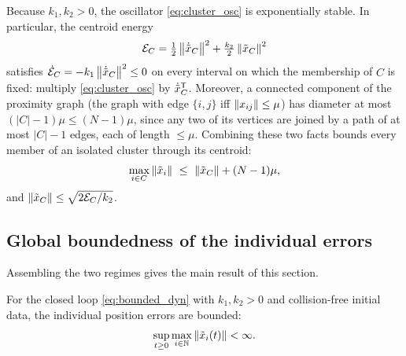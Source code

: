 Because $k_1,k_2>0$, the oscillator \eqref{eq:cluster_osc} is exponentially stable. In particular,
the centroid energy
\begin{equation}
  \mathcal E_C=\tfrac12\left\| \dot{\tilde{x}}_C \right\|^2+\tfrac{k_2}{2}\left\| \tilde{x}_C \right\|^2
  \label{eq:cluster_E}
\end{equation}
satisfies $\dot{\mathcal E}_C=-k_1\left\| \dot{\tilde{x}}_C \right\|^2\le0$ on every interval on which the
membership of $C$ is fixed: multiply \eqref{eq:cluster_osc} by $\dot{\tilde{x}}_C^{\mathsf T}$. Moreover, a
connected component of the proximity graph (the graph with edge $\{i,j\}$ iff $\left\| x_{ij} \right\|\le\mu$)
has diameter at most $(|C|-1)\mu\le(N-1)\mu$, since any two of its vertices are joined by a path of at
most $|C|-1$ edges, each of length $\le\mu$. Combining these two facts bounds every member of an
isolated cluster through its centroid:
\begin{equation}
  \max_{i\in C}\left\| \tilde{x}_i \right\|\ \le\ \left\| \tilde{x}_C \right\|+(N-1)\mu ,
  \label{eq:diam}
\end{equation}
and $\left\| \tilde{x}_C \right\|\le\sqrt{2\mathcal E_C/k_2}$.

\subsection{Global boundedness of the individual errors}
\label{sec:global}

Assembling the two regimes gives the main result of this section.

\begin{proposition}\label{prop:bounded}
For the closed loop \eqref{eq:bounded_dyn} with $k_1,k_2>0$ and collision-free initial data,
the individual position errors are bounded:
\begin{equation}
  \sup_{t\ge0}\max_{i\in\mathbb{N}}\left\| \tilde{x}_i(t) \right\|<\infty .
  \label{eq:bounded}
\end{equation}
\end{proposition}

